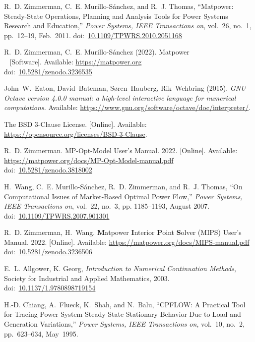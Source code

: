 \documentclass[12pt]{article}
\newcommand{\matpower}[0]{{\sc Matpower}}
\newcommand{\mips}[0]{{MIPS}}
\newcommand{\mipsname}[0]{{{\bf M}{\sc atpower} \textbf{I}nterior \textbf{P}oint \textbf{S}olver}}
\newcommand{\mpom}[0]{\mbox{MP-Opt-Model}}
\newcommand{\mpomname}[0]{\mpom{}}
\newcommand{\doi}[1]{doi:~\href{https://doi.org/#1}{#1}}
\numberwithin{equation}{section}
\numberwithin{table}{section}
\numberwithin{figure}{section}
\begin{document}
\clearpage
\begin{thebibliography}{99}
R.~D. Zimmerman, C.~E. Murillo-S{\'a}nchez, and R.~J. Thomas, ``\matpower{}: Steady-State Operations, Planning and Analysis Tools for Power Systems Research and Education,'' \emph{Power Systems, IEEE Transactions on}, vol.~26, no.~1, pp.~12--19, Feb.~2011.
\doi{10.1109/TPWRS.2010.2051168}

R.~D. Zimmerman, C.~E. Murillo-S{\'a}nchez (2022). \matpower{}\\~
[Software]. Available: \url{https://matpower.org}\\
\doi{10.5281/zenodo.3236535}

John~W.~Eaton, David~Bateman, S{\o}ren~Hauberg, Rik~Wehbring (2015). \emph{GNU Octave version 4.0.0 manual: a high-level interactive language for numerical computations.} Available: \url{https://www.gnu.org/software/octave/doc/interpreter/}.

The BSD 3-Clause License. [Online]. Available: \url{https://opensource.org/licenses/BSD-3-Clause}.

R.~D. Zimmerman. \mpomname{} User's Manual. 2022.
[Online]. Available: \url{https://matpower.org/docs/MP-Opt-Model-manual.pdf}\\
\doi{10.5281/zenodo.3818002}

H.~Wang, C.~E. Murillo-S{\'a}nchez, R.~D. Zimmerman, and R.~J. Thomas, ``On
Computational Issues of Market-Based Optimal Power Flow,'' \emph{Power
Systems, IEEE Transactions on}, vol.~22, no.~3, pp. 1185--1193, August 2007.
\doi{10.1109/TPWRS.2007.901301}

R.~D. Zimmerman, H.~Wang. \mipsname{} (\mips{}) User's Manual. 2022.
[Online]. Available: \url{https://matpower.org/docs/MIPS-manual.pdf}\\
\doi{10.5281/zenodo.3236506}

E.~L. Allgower, K. Georg, \emph{Introduction to Numerical Continuation Methods}, Society for Industrial and Applied Mathematics, 2003.
\doi{10.1137/1.9780898719154}

H.-D. Chiang, A.~Flueck, K.~Shah, and N.~Balu, ``CPFLOW:  A Practical Tool for Tracing Power System Steady-State Stationary Behavior Due to Load and Generation Variations,'' \emph{Power Systems, IEEE Transactions on}, vol.~10, no.~2, pp.~623--634, May~1995.


\end{thebibliography}
\end{document}
